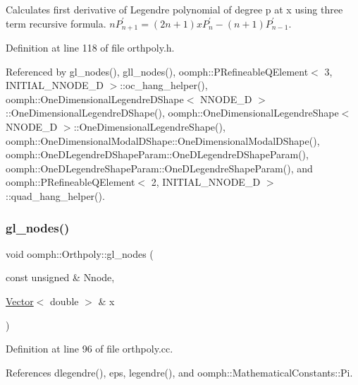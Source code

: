 Calculates first derivative of Legendre polynomial of degree p at x using three term recursive formula. $ nP_{n+1}^{'} = (2n+1)xP_{n}^{'} - (n+1)P_{n-1}^{'} $. 



Definition at line 118 of file orthpoly.\+h.



Referenced by gl\+\_\+nodes(), gll\+\_\+nodes(), oomph\+::\+P\+Refineable\+Q\+Element$<$ 3, I\+N\+I\+T\+I\+A\+L\+\_\+\+N\+N\+O\+D\+E\+\_\+D $>$\+::oc\+\_\+hang\+\_\+helper(), oomph\+::\+One\+Dimensional\+Legendre\+D\+Shape$<$ N\+N\+O\+D\+E\+\_\+D $>$\+::\+One\+Dimensional\+Legendre\+D\+Shape(), oomph\+::\+One\+Dimensional\+Legendre\+Shape$<$ N\+N\+O\+D\+E\+\_\+D $>$\+::\+One\+Dimensional\+Legendre\+Shape(), oomph\+::\+One\+Dimensional\+Modal\+D\+Shape\+::\+One\+Dimensional\+Modal\+D\+Shape(), oomph\+::\+One\+D\+Legendre\+D\+Shape\+Param\+::\+One\+D\+Legendre\+D\+Shape\+Param(), oomph\+::\+One\+D\+Legendre\+Shape\+Param\+::\+One\+D\+Legendre\+Shape\+Param(), and oomph\+::\+P\+Refineable\+Q\+Element$<$ 2, I\+N\+I\+T\+I\+A\+L\+\_\+\+N\+N\+O\+D\+E\+\_\+D $>$\+::quad\+\_\+hang\+\_\+helper().

\mbox{\label{namespaceoomph_1_1Orthpoly_a97c90eff7749f215b78cf88324d77e13}} 
\subsubsection{\texorpdfstring{gl\+\_\+nodes()}{gl\_nodes()}\hspace{0.1cm}{\footnotesize\ttfamily [1/2]}}
{\footnotesize\ttfamily void oomph\+::\+Orthpoly\+::gl\+\_\+nodes (\begin{DoxyParamCaption}\item[{const unsigned \&}]{Nnode,  }\item[{\hyperlink{classoomph_1_1Vector}{Vector}$<$ double $>$ \&}]{x }\end{DoxyParamCaption})}



Definition at line 96 of file orthpoly.\+cc.



References dlegendre(), eps, legendre(), and oomph\+::\+Mathematical\+Constants\+::\+Pi.



